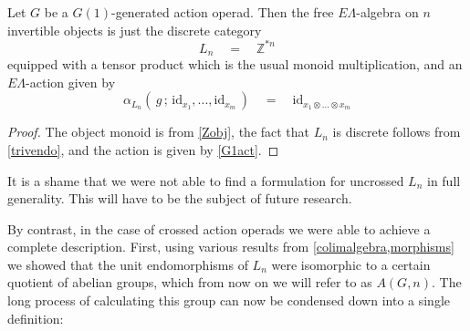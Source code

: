 \documentclass{amsbook} %
\numberwithin{section}{chapter}
\begin{document}
\begin{thm} \label{freeinvalgG1} Let $G$ be a $G(1)$-generated action operad. Then the free $E\Lambda$-algebra on $n$ invertible objects is just the discrete category
\[ L_n \quad = \quad \mathbb{Z}^{\ast n} \]
equipped with a tensor product which is the usual monoid multiplication, and an $E\Lambda$-action given by
\[ \alpha_{L_n}( \, g \, ; \, \mathrm{id}_{x_1}, ..., \mathrm{id}_{x_m} \, ) \quad = \quad \mathrm{id}_{x_1 \otimes ... \otimes x_m} \]
\end{thm}
\begin{proof}
The object monoid is from \cref{Zobj}, the fact that $L_n$ is discrete follows from \cref{trivendo}, and the action is given by \cref{G1act}.
\end{proof}

It is a shame that we were not able to find a formulation for uncrossed $L_n$ in full generality. This will have to be the subject of future research.

By contrast, in the case of crossed action operads we were able to achieve a complete description. First, using various results from \cref{colimalgebra,morphisms} we showed that the unit endomorphisms of $L_n$ were isomorphic to a certain quotient of abelian groups, which from now on we will refer to as $A(G,n)$. The long process of calculating this group can now be condensed down into a single definition:
\end{document}
